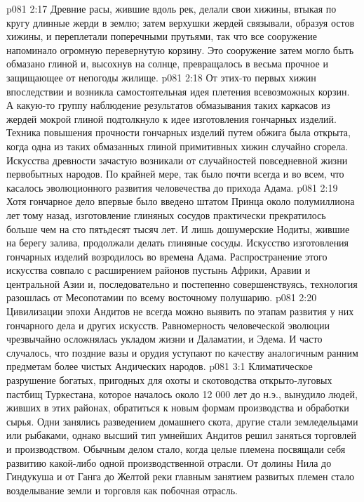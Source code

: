 \vs p081 2:17 Древние расы, жившие вдоль рек, делали свои хижины, втыкая по кругу длинные жерди в землю; затем верхушки жердей связывали, образуя остов хижины, и переплетали поперечными прутьями, так что все сооружение напоминало огромную перевернутую корзину. Это сооружение затем могло быть обмазано глиной и, высохнув на солнце, превращалось в весьма прочное и защищающее от непогоды жилище.
\vs p081 2:18 От этих\hyp{}то первых хижин впоследствии и возникла самостоятельная идея плетения всевозможных корзин. А какую\hyp{}то группу наблюдение результатов обмазывания таких каркасов из жердей мокрой глиной подтолкнуло к идее изготовления гончарных изделий. Техника повышения прочности гончарных изделий путем обжига была открыта, когда одна из таких обмазанных глиной примитивных хижин случайно сгорела. Искусства древности зачастую возникали от случайностей повседневной жизни первобытных народов. По крайней мере, так было почти всегда и во всем, что касалось эволюционного развития человечества до прихода Адама.
\vs p081 2:19 Хотя гончарное дело впервые было введено штатом Принца около полумиллиона лет тому назад, изготовление глиняных сосудов практически прекратилось больше чем на сто пятьдесят тысяч лет. И лишь дошумерские Нодиты, жившие на берегу залива, продолжали делать глиняные сосуды. Искусство изготовления гончарных изделий возродилось во времена Адама. Распространение этого искусства совпало с расширением районов пустынь Африки, Аравии и центральной Азии и, последовательно и постепенно совершенствуясь, технология разошлась от Месопотамии по всему восточному полушарию.
\vs p081 2:20 Цивилизации эпохи Андитов не всегда можно выявить по этапам развития у них гончарного дела и других искусств. Равномерность человеческой эволюции чрезвычайно осложнялась укладом жизни и Даламатии, и Эдема. И часто случалось, что поздние вазы и орудия уступают по качеству аналогичным ранним предметам более чистых Андических народов.
\vs p081 3:1 Климатическое разрушение богатых, пригодных для охоты и скотоводства открыто\hyp{}луговых пастбищ Туркестана, которое началось около 12 000 лет до н.э., вынудило людей, живших в этих районах, обратиться к новым формам производства и обработки сырья. Одни занялись разведением домашнего скота, другие стали земледельцами или рыбаками, однако высший тип умнейших Андитов решил заняться торговлей и производством. Обычным делом стало, когда целые племена посвящали себя развитию какой\hyp{}либо одной производственной отрасли. От долины Нила до Гиндукуша и от Ганга до Желтой реки главным занятием развитых племен стало возделывание земли и торговля как побочная отрасль.
